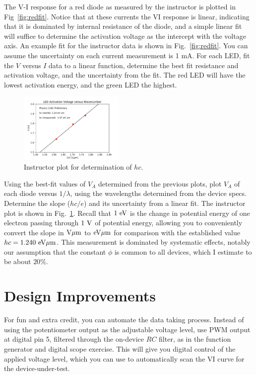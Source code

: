 \documentclass[12pt]{article}
\begin{document}
The V-I response for a red diode as measured by the instructor is
plotted in Fig~\ref{fig:redfit}.  Notice that at these currents the VI
response is linear, indicating that it is dominated by internal
resistance of the diode, and a simple linear fit will suffice to
determine the activation voltage as the intercept with the voltage
axis.  An example fit for the instructor data is shown in
Fig.~\ref{fig:redfit}.  You can assume the uncertainty on each current
measurement is 1 mA.  For each LED, fit the $V$ versus $I$ data to a
linear function, determine the best fit resistance and activation
voltage, and the uncertainty from the fit.  The red LED will have the
lowest activation energy, and the green LED the highest.

\begin{figure}[htbp]
\begin{center}
\includegraphics[width=0.45\textwidth]{figs/instructor_planck.pdf} 
\end{center}
\caption{Instructor plot for determination of $hc$.}
\label{fig:planckfit}
\end{figure}


Using the best-fit values of $V_A$ determined from the previous plots,
plot $V_A$ of each diode versus $1/\lambda$, using the wavelengths
determined from the device specs.  Determine the slope ($hc/e$) and
its uncertainty from a linear fit.  The instructor plot is shown in
Fig.~\ref{fig:planckfit}.  Recall that $1~\rm eV$ is the change in
potential energy of one electron passing through $1~\rm V$ of
potential energy, allowing you to conveniently convert the slope in
$\rm V \mu m$ to $\rm eV \mu m$ for comparison with the established
value $hc = 1.240~\rm eV \mu m$.  This measurement is dominated by
systematic effects, notably our assumption that the constant $\phi$ is
common to all devices, which I estimate to be about $20\%$.

\section{Design Improvements}

For fun and extra credit, you can automate the data taking process.
Instead of using the potentiometer output as the adjustable voltage
level, use PWM output at digital pin 5, filtered through the on-device
$RC$ filter, as in the function generator and digital scope exercise.
This will give you digital control of the applied voltage level, which
you can use to automatically scan the VI curve for the
device-under-test.
\end{document}
